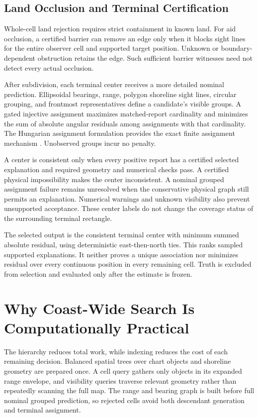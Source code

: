 \documentclass[conference]{IEEEtran}
\begin{document}
\subsection{Land Occlusion and Terminal Certification}
Whole-cell land rejection requires strict containment in known land. For aid occlusion, a certified barrier can remove an edge only when it blocks sight lines for the entire observer cell and supported target position. Unknown or boundary-dependent obstruction retains the edge. Such sufficient barrier witnesses need not detect every actual occlusion.

After subdivision, each terminal center receives a more detailed nominal prediction. Ellipsoidal bearings, range, polygon shoreline sight lines, circular grouping, and frontmost representatives define a candidate's visible groups. A gated injective assignment maximizes matched-report cardinality and minimizes the sum of absolute angular residuals among assignments with that cardinality. The Hungarian assignment formulation provides the exact finite assignment mechanism \cite{Kuhn1955Assignment}. Unobserved groups incur no penalty.

A center is consistent only when every positive report has a certified selected explanation and required geometry and numerical checks pass. A certified physical impossibility makes the center inconsistent. A nominal grouped assignment failure remains unresolved when the conservative physical graph still permits an explanation. Numerical warnings and unknown visibility also prevent unsupported acceptance. These center labels do not change the coverage status of the surrounding terminal rectangle.

The selected output is the consistent terminal center with minimum summed absolute residual, using deterministic east-then-north ties. This ranks sampled supported explanations. It neither proves a unique association nor minimizes residual over every continuous position in every remaining cell. Truth is excluded from selection and evaluated only after the estimate is frozen.

\section{Why Coast-Wide Search Is Computationally Practical}
The hierarchy reduces total work, while indexing reduces the cost of each remaining decision. Balanced spatial trees over chart objects and shoreline geometry are prepared once. A cell query gathers only objects in its expanded range envelope, and visibility queries traverse relevant geometry rather than repeatedly scanning the full map. The range and bearing graph is built before full nominal grouped prediction, so rejected cells avoid both descendant generation and terminal assignment.
\end{document}
